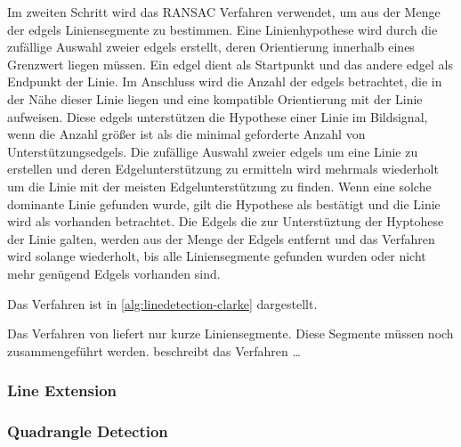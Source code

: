 Im zweiten Schritt wird das RANSAC Verfahren verwendet, um aus der Menge der \gls{edgels} Liniensegmente zu bestimmen.
 Eine Linienhypothese wird durch die zufällige Auswahl zweier \gls{edgels} erstellt, deren Orientierung innerhalb eines
 Grenzwert liegen müssen. Ein edgel dient als Startpunkt und das andere edgel als Endpunkt der Linie. Im Anschluss wird
 die Anzahl der \gls{edgels} betrachtet, die in der Nähe dieser Linie liegen und eine kompatible Orientierung mit der
 Linie aufweisen. Diese \gls{edgels} unterstützen die Hypothese einer Linie im Bildsignal, wenn die Anzahl größer ist
 als die minimal geforderte Anzahl von Unterstützungsedgels. Die zufällige Auswahl zweier \gls{edgels} um eine Linie zu
 erstellen und deren Edgelunterstützung zu ermitteln wird mehrmals wiederholt um die Linie mit der meisten
 Edgelunterstützung zu finden. Wenn eine solche dominante Linie gefunden wurde, gilt die Hypothese als bestätigt und
 die Linie wird als vorhanden betrachtet. Die Edgels die zur Unterstüztung der Hyptohese der Linie galten, werden aus
 der Menge der Edgels entfernt und das Verfahren wird solange wiederholt, bis alle Liniensegmente gefunden wurden oder
 nicht mehr genügend Edgels vorhanden sind.

Das Verfahren ist in \autoref{alg:linedetection-clarke} dargestellt.



Das Verfahren von \citeauthor{clarke96} liefert nur kurze Liniensegmente. Diese Segmente müssen noch zusammengeführt werden. \citeauthor{hirzer08} beschreibt das Verfahren \dots

\subsubsection{Line Extension} %
\label{sub:line_extension}

\subsubsection{Quadrangle Detection} %
\label{sub:quadrangle_detection}

